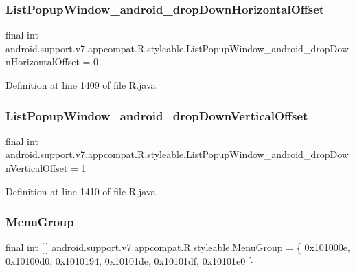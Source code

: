 \subsubsection{\texorpdfstring{ListPopupWindow\_android\_dropDownHorizontalOffset}{ListPopupWindow\_android\_dropDownHorizontalOffset}}
{\footnotesize\ttfamily final int android.\+support.\+v7.\+appcompat.\+R.\+styleable.\+List\+Popup\+Window\+\_\+android\+\_\+drop\+Down\+Horizontal\+Offset = 0\hspace{0.3cm}{\ttfamily [static]}}



Definition at line 1409 of file R.\+java.

\mbox{\label{classandroid_1_1support_1_1v7_1_1appcompat_1_1_r_1_1styleable_a8c66ee61979b855940af2e36f6a6a6a0}} 
\subsubsection{\texorpdfstring{ListPopupWindow\_android\_dropDownVerticalOffset}{ListPopupWindow\_android\_dropDownVerticalOffset}}
{\footnotesize\ttfamily final int android.\+support.\+v7.\+appcompat.\+R.\+styleable.\+List\+Popup\+Window\+\_\+android\+\_\+drop\+Down\+Vertical\+Offset = 1\hspace{0.3cm}{\ttfamily [static]}}



Definition at line 1410 of file R.\+java.

\mbox{\label{classandroid_1_1support_1_1v7_1_1appcompat_1_1_r_1_1styleable_aef793c0a19e198b57791fed45ec2804e}} 
\subsubsection{\texorpdfstring{MenuGroup}{MenuGroup}}
{\footnotesize\ttfamily final int \mbox{[}$\,$\mbox{]} android.\+support.\+v7.\+appcompat.\+R.\+styleable.\+Menu\+Group = \{ 0x101000e, 0x10100d0, 0x1010194, 0x10101de, 0x10101df, 0x10101e0 \}\hspace{0.3cm}{\ttfamily [static]}}




